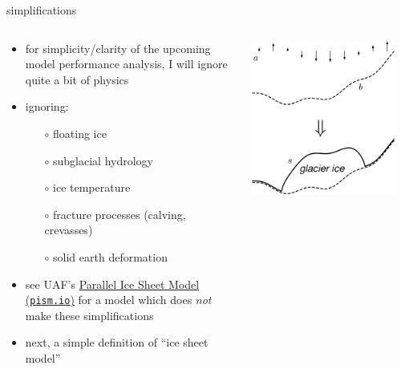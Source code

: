 \documentclass[svgnames,
               hyperref={colorlinks,citecolor=DeepPink4,linkcolor=FireBrick,urlcolor=Maroon},
               usepdftitle=false]  %
               {beamer}
\begin{document}
\begin{frame}{simplifications}

\begin{columns}
\begin{column}{0.6\textwidth}
\begin{itemize}
\item for simplicity/clarity of the upcoming model performance analysis, I will ignore quite a bit of physics
\item \alert{ignoring}:
    \begin{itemize}
    \item[$\circ$] floating ice
    \item[$\circ$] subglacial hydrology
    \item[$\circ$] ice temperature
    \item[$\circ$] fracture processes (calving, crevasses)
    \item[$\circ$] solid earth deformation
    \end{itemize}

\medskip
\item<2> {\footnotesize see UAF's \href{https://pism.io/}{Parallel Ice Sheet Model (\texttt{pism.io})} for a model which does \emph{not} make these simplifications}
\item<2> {\footnotesize next, a simple definition of ``ice sheet model''}
\end{itemize}
\end{column}
\begin{column}{0.42\textwidth}
\hfill \includegraphics[width=0.9\textwidth]{images/map-glacier-ice.png}
\end{column}
\end{columns}
\end{frame}
\end{document}
